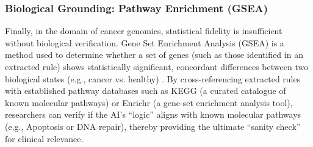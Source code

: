 \subsubsection{Biological Grounding: Pathway Enrichment (GSEA)}
\label{ssub:gsea}
Finally, in the domain of cancer genomics, statistical fidelity is insufficient without biological
verification. Gene Set Enrichment Analysis (GSEA) is a method used to determine whether a set of
genes (such as those identified in an extracted rule) shows statistically significant, concordant
differences between two biological states (e.g., cancer vs. healthy) \cite{Subramanian2005}. By cross-referencing extracted rules with established pathway databases such as KEGG (a curated
catalogue of known molecular pathways) or Enrichr (a gene-set enrichment analysis tool), researchers
can verify if the AI's ``logic'' aligns with known molecular pathways (e.g., Apoptosis or DNA repair),
thereby providing the ultimate ``sanity check'' for clinical relevance.